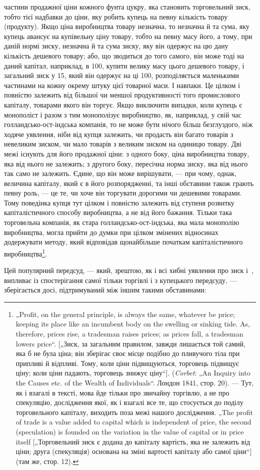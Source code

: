 \parcont{}  %
частини продажної ціни кожного фунта цукру, яка становить
торговельний зиск, тобто тієї надбавки до ціни, яку робить
купець на певну кількість товару (продукту). Якщо ціна виробництва
товару незначна, то незначна й та сума, яку купець
авансує на купівельну ціну товару, тобто на певну масу його,
а тому, при даній нормі зиску, незначна й та сума зиску, яку
він одержує на цю дану кількість дешевого товару; або, що
зводиться до того самого, він може тоді на даний капітал, наприклад,
в 100, купити велику масу цього дешевого товару,
і загальний зиск у 15, який він одержує на ці 100, розподіляється
маленькими частинами на кожну окрему штуку цієї товарної
маси. І навпаки. Це цілком і повністю залежить від більшої
чи меншої продуктивності того промислового капіталу, товарами
якого він торгує. Якщо виключити випадки, коли купець є монополіст
і разом з тим монополізує виробництво, як, наприклад,
у свій час голландсько-ост-індська компанія, то не може бути
нічого більш безглуздого, ніж ходяче уявлення, ніби від купця
залежить, чи продасть він багато товарів з невеликим зиском,
чи мало товарів з великим зиском на одиницю товару. Дві
межі існують для його продажної ціни: з одного боку, ціна виробництва
товару, яка від нього не залежить; з другого боку, пересічна
норма зиску, яка від нього так само не залежить. Єдине,
що він може вирішувати, — при чому, однак, величина капіталу,
який є в його розпорядженні, та інші обставини також грають
певну роль, — це те, чи хоче він торгувати дорогими чи дешевими
товарами. Тому поведінка купця тут цілком і повністю залежить
від ступеня розвитку капіталістичного способу виробництва,
а не від його бажання. Тільки така торговельна компанія, як стара
голландсько-ост-індська, яка мала монополію виробництва, могла
прийти до думки при цілком змінених відносинах додержувати
методу, який відповідав щонайбільше початкам капіталістичного
виробництва\footnote{
„Profit, on the general principle, is always the same, whatever be price;
keeping its place like an incumbent body on the swelling or sinking tide. As,
therefore, prices rise, a tradesman raises prices; as prices fall, a tradesman lowers
price“. [„Зиск, за загальним правилом, завжди лишається той самий, яка б не була
ціна; він зберігає своє місце подібно до пливучого тіла при припливі й відпливі.
Тому, коли ціни підвищуються, торговець підвищує ціну; коли ціни падають,
торговець знижує ціну“]. (\emph{Corbet}: „An Inquiry into the Causes etc. of the Wealth
of Individuals“. Лондон 1841, стор. 20). — Тут, як і взагалі в тексті, мова йде
тільки про звичайну торгівлю, а не про спекуляцію, дослідження якої, як і взагалі
все те, що стосується до поділу торговельного капіталу, виходить поза
межі нашого дослідження. „The profit of trade is a value added to capital which
is independent of price, the second (speculation) is founded on the variation in
the value of capital or in price itself [„Торговельний зиск є додана до капіталу
вартість, яка не залежить від ціни; друга (спекуляція) основана на зміні вартості
капіталу або самої ціни“] (там же, стор. 12).
}.

Цей популярний передсуд, — який, зрештою, як і всі хибні
уявлення про зиск і~, випливає із спостерігання самої тільки
торгівлі і з купецького передсуду, — зберігається досі, підтримуваний
між іншим такими обставинами:
\parbreak{}  %
